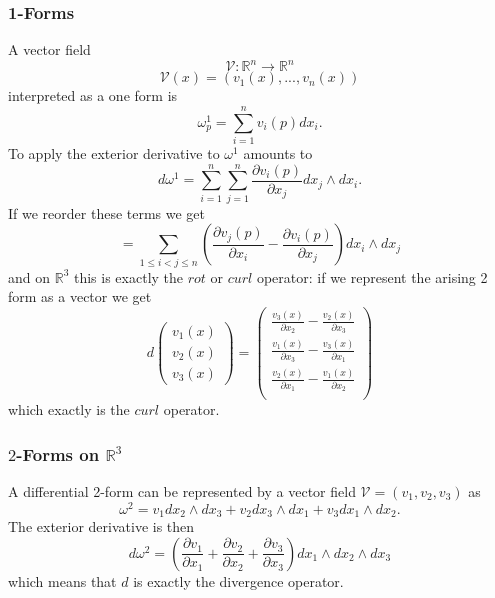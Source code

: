 \subsubsection{1-Forms}
A vector field 
\[\mathcal V : \mathbb R^n \to \mathbb R^n\]
\[\mathcal V(x) = (v_1(x),...,v_n(x))\]
 interpreted as a one form is
\[\omega^1_p = \sum_{i = 1}^n v_i(p) d x_i .\]
To apply the exterior derivative to $\omega^1$ amounts to
\[d\omega^1 = \sum_{i=1}^n \sum_{j = 1} ^n \frac{\partial v_i(p)}{\partial x_j} dx_j \wedge d x_i.\]
If we reorder these terms we get
\[= \sum_{1\leq i < j \leq n } (\frac{\partial v_j(p)}{\partial x_i} - \frac{\partial v_i(p)}{\partial x_j}) dx_i \wedge d x_j\]
and on $\mathbb R^3$ this is exactly the $rot$ or $curl$ operator: if we represent the arising 2 form as a vector we get
\[d \begin{pmatrix}
v_1(x) \\ v_2(x) \\ v_3(x)
\end{pmatrix} = \begin{pmatrix}
\frac{v_3(x)}{\partial x_2} -\frac{v_2(x)}{\partial x_3}\\
\frac{v_1(x)}{\partial x_3} -\frac{v_3(x)}{\partial x_1}\\
\frac{v_2(x)}{\partial x_1} -\frac{v_1(x)}{\partial x_2}\\
\end{pmatrix}\]
which exactly is the $curl$ operator.

\subsubsection{$2$-Forms on $\mathbb R^3$}
A differential 2-form can be represented by a vector field $\mathcal V = (v_1,v_2,v_3)$ as
\[\omega^2 = v_1 dx_2 \wedge dx_3 + v_2 dx_3 \wedge dx_1 + v_3 dx_1 \wedge dx_2.\]
The exterior derivative is then
\[d \omega^2 = (\frac{\partial v_1}{\partial x_1} + \frac{\partial v_2}{\partial x_2} + \frac{\partial v_3}{\partial x_3})dx_1\wedge dx_2 \wedge dx_3\]
which means that $d$ is exactly the divergence operator.


